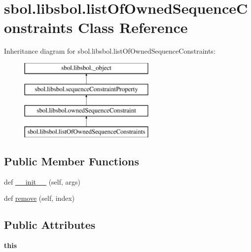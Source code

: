 \hypertarget{classsbol_1_1libsbol_1_1list_of_owned_sequence_constraints}{}\section{sbol.\+libsbol.\+list\+Of\+Owned\+Sequence\+Constraints Class Reference}
\label{classsbol_1_1libsbol_1_1list_of_owned_sequence_constraints}
Inheritance diagram for sbol.\+libsbol.\+list\+Of\+Owned\+Sequence\+Constraints\+:\begin{figure}[H]
\begin{center}
\leavevmode
\includegraphics[height=4.000000cm]{classsbol_1_1libsbol_1_1list_of_owned_sequence_constraints}
\end{center}
\end{figure}
\subsection*{Public Member Functions}
\begin{DoxyCompactItemize}
\item 
def \hyperlink{classsbol_1_1libsbol_1_1list_of_owned_sequence_constraints_a81ff041e1d7ad199ec6fd6f15e3fad71}{\+\_\+\+\_\+init\+\_\+\+\_\+} (self, args)
\item 
def \hyperlink{classsbol_1_1libsbol_1_1list_of_owned_sequence_constraints_a795739ab5b53c119ec54998a517624b0}{remove} (self, index)
\end{DoxyCompactItemize}
\subsection*{Public Attributes}
\begin{DoxyCompactItemize}
\item 
{\bfseries this}\hypertarget{classsbol_1_1libsbol_1_1list_of_owned_sequence_constraints_a5684d5bffaf2217e755d44bbb45757be}{}\label{classsbol_1_1libsbol_1_1list_of_owned_sequence_constraints_a5684d5bffaf2217e755d44bbb45757be}

\end{DoxyCompactItemize}
